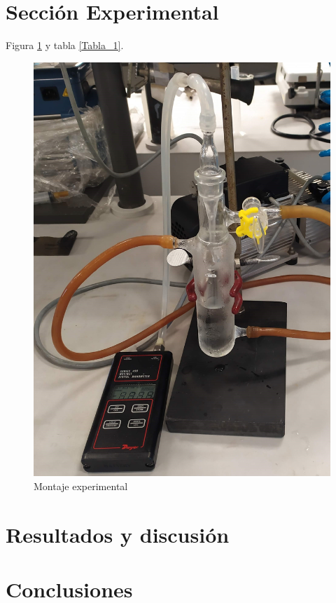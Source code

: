\documentclass[11pt,fleqn]{article} %
\begin{document}
\begin{multicols}{2}
		\section{Sección Experimental} 
		
		Figura \ref{Montaje_exp} y tabla \ref{Tabla_1}.
		
		\begin{figure}[H]			
			\centering
			\includegraphics[scale=0.04]{Imagenes/Montaje.png}
			\caption{Montaje experimental} 
			\label{Montaje_exp}	
		\end{figure}
				
		\section{Resultados y discusión}
				
		\section{Conclusiones} 	 
		 
		
	\end{multicols}	
	
\end{document}
